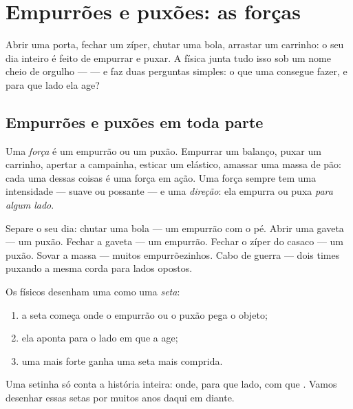 \chapter{Empurrões e puxões: as forças}\label{ch:g2:pushes-and-pulls}

Abrir uma porta, fechar um zíper, chutar uma bola, arrastar um
carrinho: o seu dia inteiro é feito de empurrar e puxar. A física
junta tudo isso sob um nome cheio de orgulho --- \emph{} --- e
faz duas perguntas simples: o que uma  consegue fazer, e para
que lado ela age?

\section{Empurrões e puxões em toda parte}

\begin{definition}[Força]\label{def:g2:pushes-and-pulls:force}
Uma \emph{força} é um empurrão ou um puxão. Empurrar um
balanço, puxar um carrinho, apertar a campainha, esticar um
elástico, amassar uma massa de pão: cada uma dessas coisas é uma
força em ação. Uma força sempre tem uma intensidade --- suave ou
possante --- e uma \emph{direção}: ela empurra ou puxa \emph{para
algum lado}.
\end{definition}

\begin{example}\label{ex:g2:pushes-and-pulls:sort}
Separe o seu dia: chutar uma bola --- um empurrão com o pé. Abrir uma
gaveta --- um puxão. Fechar a gaveta --- um empurrão. Fechar o zíper
do casaco --- um puxão. Sovar a massa --- muitos empurrõezinhos.
Cabo de guerra --- dois times puxando a mesma corda para lados
opostos.
\end{example}

\begin{method}\label{met:g2:pushes-and-pulls:arrow}
Os físicos desenham uma  como uma \emph{seta}:
\begin{enumerate}
  \item a seta começa onde o empurrão ou o puxão pega o objeto;
  \item ela aponta para o lado em que a  age;
  \item uma  mais forte ganha uma seta mais comprida.
\end{enumerate}
Uma setinha só conta a história inteira: onde, para que lado, com que
. Vamos desenhar essas setas por muitos anos daqui em diante.
\end{method}

